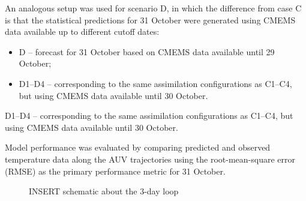 An analogous setup was used for scenario D, in which the difference
from case C is that the statistical predictions for 31 October were
generated using CMEMS data available up to different cutoff dates:

\begin{itemize}
    \item D – forecast for 31 October based on CMEMS data available until 29 October;
    \item D1–D4 – corresponding to the same assimilation
      configurations as C1–C4, but using CMEMS data available until 30
      October.
\end{itemize}
D1–D4 – corresponding to the same assimilation configurations as
C1–C4, but using CMEMS data available until 30 October.

Model performance was evaluated by comparing predicted and observed
temperature data along the AUV trajectories using the root-mean-square
error (RMSE) as the primary performance metric for 31 October.

\begin{figure}
    \centering
    \caption{INSERT schematic about the 3-day loop}
    \label{fig:temperatureprofiles}
\end{figure}


%
    



